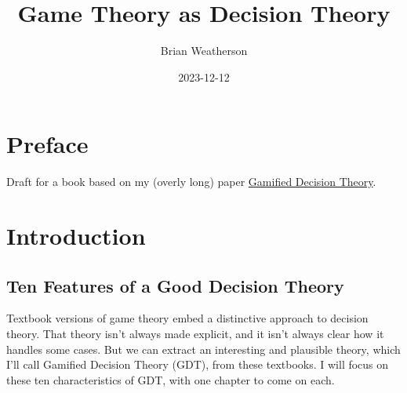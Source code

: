 \documentclass[
  12pt,
  letterpaper,
  DIV=11,
  numbers=noendperiod]{scrreprt}
\title{Game Theory as Decision Theory}
\author{Brian Weatherson}
\date{2023-12-12}
\renewcommand*\contentsname{Table of contents}
\newcommand\contentsname{Table of contents}
\begin{document}
\maketitle

\renewcommand*\contentsname{Table of contents}
{
\hypersetup{linkcolor=}
\setcounter{tocdepth}{2}
\tableofcontents
}

\chapter*{Preface}\label{preface}


Draft for a book based on my (overly long) paper
\href{https://brian.weatherson.org/gdt/gdt.html}{Gamified Decision
Theory}.


\chapter{Introduction}\label{sec-intro}

\section{Ten Features of a Good Decision Theory}\label{sec-ten-features}

Textbook versions of game theory embed a distinctive approach to
decision theory. That theory isn't always made explicit, and it isn't
always clear how it handles some cases. But we can extract an
interesting and plausible theory, which I'll call Gamified Decision
Theory (GDT), from these textbooks. I will focus on these ten
characteristics of GDT, with one chapter to come on each.
\end{document}
